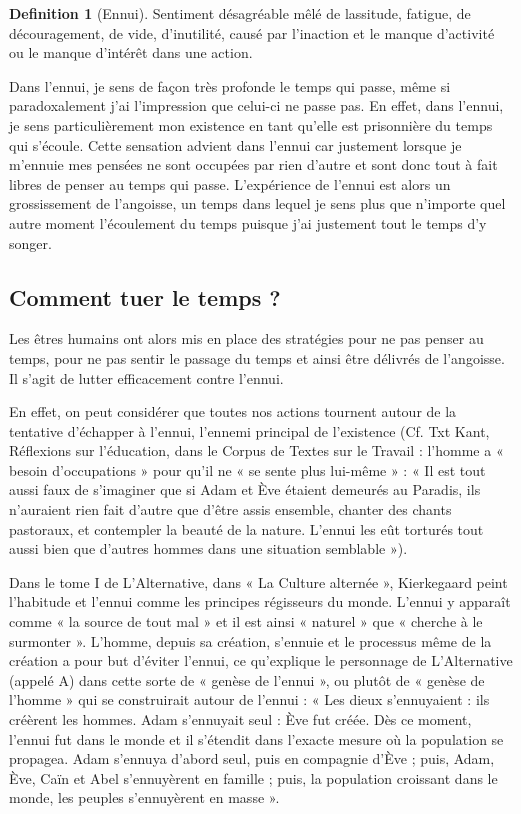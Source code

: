 \documentclass[french]{book}
\theoremstyle{definition}
\newtheorem*{dfn}{Definition}
\begin{document}
\begin{dfn}[Ennui]
Sentiment désagréable mêlé de lassitude, fatigue, de découragement, de vide, d'inutilité, causé par l'inaction et le manque d'activité ou le manque d'intérêt dans une action.
\end{dfn}

Dans l'ennui, je sens de façon très profonde le temps qui passe, même si paradoxalement j’ai l’impression que celui-ci ne passe pas. En effet, dans l'ennui, je sens particulièrement mon existence en tant qu’elle est prisonnière du temps qui s’écoule. Cette sensation advient dans l’ennui car justement lorsque je m’ennuie mes pensées ne sont occupées par rien d’autre et sont donc tout à fait libres de penser au temps qui passe. L’expérience de l’ennui est alors un grossissement de l’angoisse, un temps dans lequel je sens plus que n’importe quel autre moment l’écoulement du temps puisque j’ai justement tout le temps d’y songer.

\subsection{Comment tuer le temps ?}

Les êtres humains ont alors mis en place des stratégies pour ne pas penser au temps, pour ne pas sentir le passage du temps et ainsi être délivrés de l’angoisse. Il s’agit de lutter efficacement contre l’ennui.

En effet, on peut considérer que toutes nos actions tournent autour de la tentative d’échapper à l’ennui, l’ennemi principal de l’existence (Cf. Txt Kant, Réflexions sur l’éducation, dans le Corpus de Textes sur le Travail : l’homme a « besoin d’occupations » pour qu’il ne « se sente plus lui-même » : « Il est tout aussi faux de s’imaginer que si Adam et Ève étaient demeurés au Paradis, ils n’auraient rien fait d’autre que d’être assis ensemble, chanter des chants pastoraux, et contempler la beauté de la nature. L’ennui les eût torturés tout aussi bien que d’autres hommes dans une situation semblable »).

Dans le tome I de L’Alternative, dans « La Culture alternée », Kierkegaard peint l’habitude et l’ennui comme les principes régisseurs du monde. L’ennui y apparaît comme « la source de tout mal » et il est ainsi « naturel » que « cherche à le surmonter ». L’homme, depuis sa création, s’ennuie et le processus même de la création a pour but d’éviter l’ennui, ce qu’explique le personnage de L’Alternative (appelé A) dans cette sorte de « genèse de l’ennui », ou plutôt de « genèse de l’homme » qui se construirait autour de l’ennui : « Les dieux s’ennuyaient : ils créèrent les hommes. Adam s’ennuyait seul : Ève fut créée. Dès ce moment, l’ennui fut dans le monde et il s’étendit dans l’exacte mesure où la population se propagea. Adam s’ennuya d’abord seul, puis en compagnie d’Ève ; puis, Adam, Ève, Caïn et Abel s’ennuyèrent en famille ; puis, la population croissant dans le monde, les peuples s’ennuyèrent en masse ».
\end{document}
